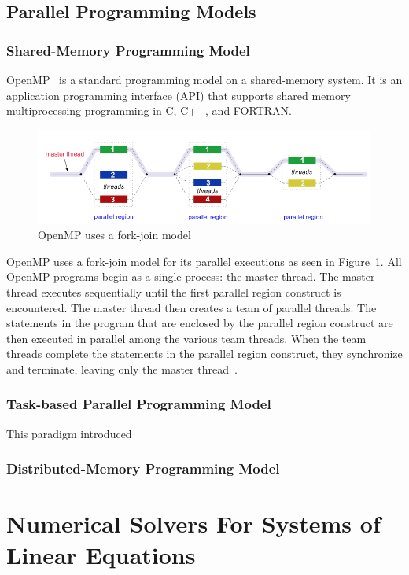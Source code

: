 \subsection{Parallel Programming Models}
\subsubsection{Shared-Memory Programming Model}
OpenMP~\cite{openmp, OpenMP4.0} is a standard programming model on a 
shared-memory system. It is an application programming interface (API) that 
supports shared memory multiprocessing programming in C, C++, and FORTRAN.
\begin{figure}[H]
    \centerline{\includegraphics[scale=0.50]{background/figs/fork_join.png}}
    \caption{OpenMP uses a fork-join model}
    \label{fig:fork-join}
\end{figure}
OpenMP uses a fork-join model for its parallel executions as seen in 
Figure~\ref{fig:fork-join}.
All OpenMP programs begin as a single process: the master thread. The master 
thread executes sequentially until the first parallel region construct is 
encountered. The master thread then creates a team of parallel threads.
The statements in the program that are enclosed by the parallel region construct 
are then executed in parallel among the various team threads. When the team 
threads complete the statements in the parallel region construct, they 
synchronize and terminate, leaving only the master thread~\cite{llnl_openmp}.

\subsubsection{Task-based Parallel Programming Model}
This paradigm introduced 

\subsubsection{Distributed-Memory Programming Model}

\section{Numerical Solvers For Systems of Linear Equations}
